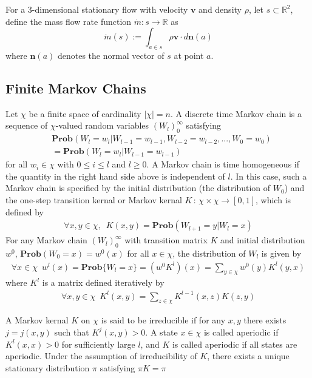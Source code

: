 \documentclass{article}
\begin{document}
For a 3-dimensional stationary flow with velocity $\mathbf{v}$ and density $\rho$, let $s \subset \mathbb{R}^2$, define the mass flow rate function $\dot{m}:s \rightarrow \mathbb{R}$ as
\begin{equation*}
\dot{m}(s) := \int_{a \in s} \rho \mathbf{v} \cdot d\mathbf{n}(a) 
\end{equation*}
where $\mathbf{n}(a)$ denotes the normal vector of $s$ at point $a$.


\subsection{Finite Markov Chains}
Let $\chi$ be a finite space of cardinality $|\chi|=n$. A discrete time Markov chain is a sequence of $\chi$-valued random variables $(W_l)_0^{\infty}$ satisfying
\begin{eqnarray*}
 &\mathbf{Prob}(W_l = w_l | W_{l-1} = w_{l-1},W_{l-2} = w_{l-2},...,W_0 = w_0)  \\
 &=\mathbf{Prob}(W_{l} = w_l | W_{l-1} = w_{l-1})
\end{eqnarray*}
for all $w_i \in \chi$ with $0 \le i \le l$ and $l\ge 0$. A Markov chain is time homogeneous if the quantity in the right hand side above is independent of $l$. In this case, such a Markov chain is specified by the initial distribution (the distribution of $W_0$) and the one-step transition kernal or Markov kernal $K\,:\, \chi \times \chi \rightarrow [0,1]$, which is defined by
\begin{eqnarray*}
\forall x,y \in \chi, \,\,\, K(x,y)=\mathbf{Prob}(W_{l+1} = y |
W_{l} = x)
\end{eqnarray*}
For any Markov chain $(W_l)_0^{\infty}$ with transition matrix $K$ and initial distribution $w^0$,  $\mathbf{Prob}(W_0=x)=w^0(x)$ for all $x \in \chi$, the distribution of $W_l$ is given by
\begin{eqnarray}
\label{Kevolvedistribution} \forall x\in \chi \,\,\, w^l(x) =
\mathbf{Prob}\{W_l=x\}=(w^0 K^l)(x)=\sum_{y\in \chi} w^0(y)K^l(y,x)
\end{eqnarray}
where $K^l$ is a matrix defined iteratively by
\begin{eqnarray*}
\forall x,y \in \chi \,\,\, K^l(x,y)=\sum_{z \in
\chi}K^{l-1}(x,z)K(z,y)
\end{eqnarray*}


A Markov kernal $K$ on $\chi$ is said to be irreducible if for any $x,y$ there exists $j = j(x,y)$ such that $K^j(x,y)>0$. A state $x\in\chi$ is called aperiodic if $K^l(x,x)>0$ for sufficiently large $l$, and $K$ is called aperiodic if all states are aperiodic. Under the assumption of irreducibility of $K$, there exists a unique
stationary distribution $\pi$ satisfying $\pi K =\pi$
\end{document}

